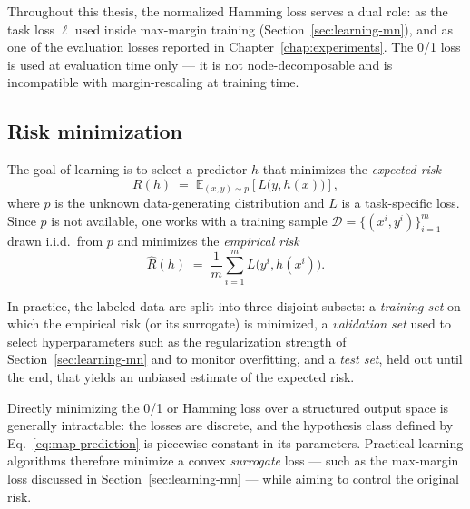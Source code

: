 Throughout this thesis, the normalized Hamming loss serves a dual
role: as the task loss $\ell$ used inside max-margin training
(Section~\ref{sec:learning-mn}), and as one of the evaluation losses
reported in Chapter~\ref{chap:experiments}. The 0/1 loss is used at
evaluation time only --- it is not node-decomposable and is
incompatible with margin-rescaling at training time.

\subsection{Risk minimization}

The goal of learning is to select a predictor $h$ that minimizes the
\emph{expected risk}
\begin{equation}
    R(h) \;=\; \mathbb{E}_{(x, y) \sim p}\!\left[
    L\bigl(y, h(x)\bigr) \right],
    \label{eq:expected-risk}
\end{equation}
where $p$ is the unknown data-generating distribution and $L$ is a
task-specific loss. Since $p$ is not available, one works with a
training sample
$\mathcal{D} = \{(x^i, y^i)\}_{i=1}^{m}$ drawn i.i.d.\ from $p$ and
minimizes the \emph{empirical risk}
\begin{equation}
    \hat{R}(h) \;=\; \frac{1}{m} \sum_{i=1}^{m}
    L\bigl(y^i, h(x^i)\bigr).
    \label{eq:empirical-risk}
\end{equation}

In practice, the labeled data are split into three disjoint
subsets: a \emph{training set} on which the empirical risk (or its
surrogate) is minimized, a \emph{validation set} used to select
hyperparameters such as the regularization strength of
Section~\ref{sec:learning-mn} and to monitor overfitting, and a
\emph{test set}, held out until the end, that yields an unbiased
estimate of the expected risk.

Directly minimizing the 0/1 or Hamming loss over a structured output
space is generally intractable: the losses are discrete, and the
hypothesis class defined by Eq.~\eqref{eq:map-prediction} is piecewise
constant in its parameters. Practical learning algorithms therefore
minimize a convex \emph{surrogate} loss --- such as the max-margin loss
discussed in Section~\ref{sec:learning-mn} --- while aiming to control
the original risk.

